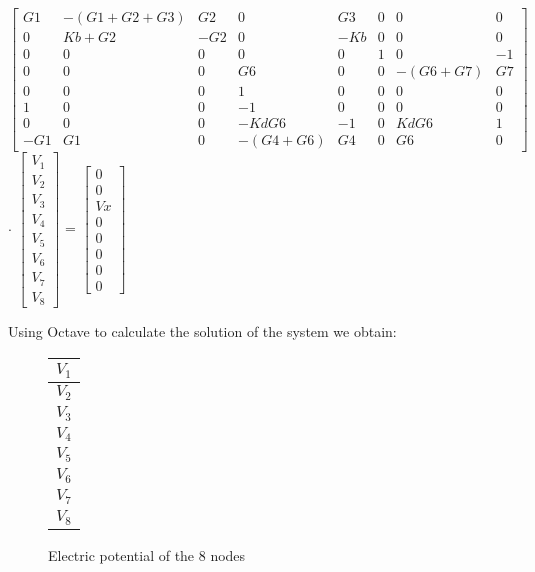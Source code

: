 \fontsize{8}{12}\selectfont
$\begin{bmatrix}
    G1 & -(G1+G2+G3) & G2 & 0 & G3 & 0 & 0 & 0 \\
    0 & Kb+G2 & -G2 & 0 & -Kb & 0 & 0 & 0 \\
    0 & 0 & 0 & 0 & 0 & 1 & 0 & -1 \\
    0 & 0 & 0 & G6 & 0 & 0 & -(G6+G7) & G7 \\
    0 & 0 & 0 & 1 & 0 & 0 & 0 & 0 \\
    1 & 0 & 0 & -1 & 0 & 0 & 0 & 0 \\
    0 & 0 & 0 & -KdG6 & -1 & 0 & KdG6 & 1 \\
    -G1 & G1 & 0 & -(G4+G6) & G4 & 0 & G6 & 0
\end{bmatrix}$ $\cdot$
$\begin{bmatrix}
     V_1 \\V_2 \\V_3 \\V_4 \\V_5 \\V_6 \\V_7 \\V_8
\end{bmatrix}$ =
$\begin{bmatrix}
    0 \\0 \\Vx \\0 \\0 \\0 \\0 \\0 
\end{bmatrix}$

\fontsize{11}{12}\selectfont
\vspace{20pt}

Using Octave to calculate the solution of the system we obtain:

\begin{figure}[h]
	\begin{center}
	    \begin{minipage}{.3\textwidth}
		\flushright
		\begin{tabular}{|c|}
		    \hline
		    $V_1$ \\
		    \hline
		    $V_2$ \\
		    \hline
		    $V_3$ \\
		    \hline
		    $V_4$ \\
		    \hline
		    $V_5$ \\
		    \hline
		    $V_6$ \\
		    \hline
		    $V_7$ \\
		    \hline
		    $V_8$ \\
		    \hline
		\end{tabular}
	    \end{minipage}
	    \hspace{-8pt}
	    \begin{minipage}{.3\textwidth}
		\flushleft
		
	    \end{minipage}
	\end{center}
	\caption{Electric potential of the 8 nodes}
	\label{theory_voltages}
\end{figure}

